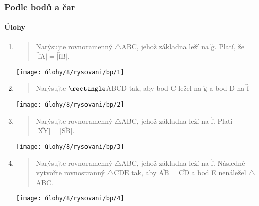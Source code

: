 \newpage

\subsubsection{Podle bodů a čar}

\paragraph{Úlohy}
\begin{enumerate}
    \item
    \begin{minipage}[t]{\linewidth}
        \begin{quote}
            Narýsujte rovnoramenný $\triangle$ABC, jehož základna leží na $\overleftrightarrow{\text{g}}$.
            Platí, že $\lvert \overleftrightarrow{\text{f}} \text{A} \rvert = \lvert \overleftrightarrow{\text{f}} \text{B} \rvert$.
        \end{quote}
        \centering
        \texttt{[image: úlohy/8/rysovani/bp/1]}

    \end{minipage}

    \item
    \begin{minipage}[t]{\linewidth}
        \begin{quote}
            Narýsujte $\rectangle$ABCD tak, aby bod C ležel na $\overleftrightarrow{\text{g}}$ a bod D na $\overleftrightarrow{\text{f}}$
        \end{quote}
        \centering
        \texttt{[image: úlohy/8/rysovani/bp/2]}

    \end{minipage}

    \item
    \begin{minipage}[t]{\linewidth}
        \begin{quote}
            Narýsujte rovnoramenný $\triangle$ABC, jehož základna leží na $\overleftrightarrow{\text{f}}$.
            Platí $\lvert \overline{\text{XY}} \rvert = \lvert \overline{\text{SB}} \rvert$.
        \end{quote}
        \centering
        \texttt{[image: úlohy/8/rysovani/bp/3]}

    \end{minipage}

    \item
    \begin{minipage}[t]{\linewidth}
        \begin{quote}
            Narýsujte rovnoramenný $\triangle$ABC, jehož základna leží na $\overleftrightarrow{\text{f}}$.
            Následně vytvořte rovnostranný $\triangle{\text{CDE}}$ tak, aby $\overline{\text{AB}} \perp \overline{\text{CD}}$ a bod E nenáležel $\triangle$ABC\@.
        \end{quote}
        \centering
        \texttt{[image: úlohy/8/rysovani/bp/4]}


\end{minipage}
\end{enumerate}
